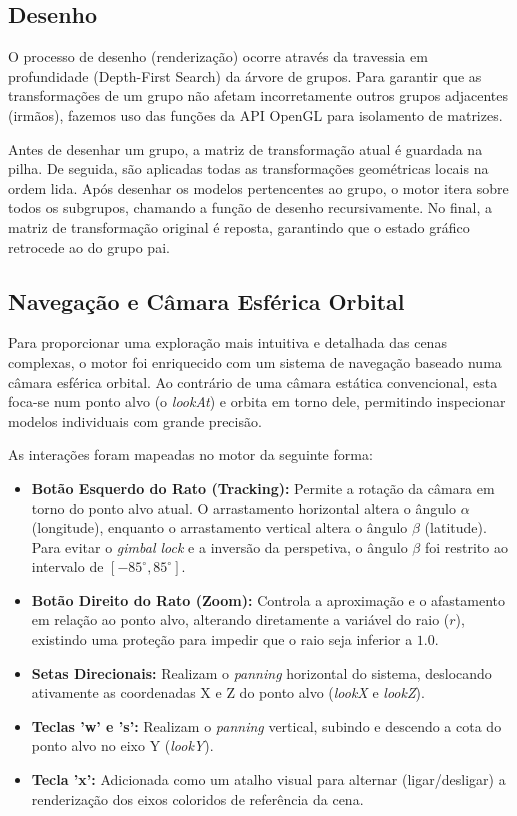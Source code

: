 \documentclass[12pt,a4paper]{article}
\begin{document}
\subsection{Desenho} 
O processo de desenho (renderização) ocorre através da travessia em profundidade (Depth-First Search) da árvore de grupos. Para garantir que as transformações de um grupo não afetam incorretamente outros grupos adjacentes (irmãos), fazemos uso das funções da API OpenGL para isolamento de matrizes.

Antes de desenhar um grupo, a matriz de transformação atual é guardada na pilha. De seguida, são aplicadas todas as transformações geométricas locais na ordem lida. Após desenhar os modelos pertencentes ao grupo, o motor itera sobre todos os subgrupos, chamando a função de desenho recursivamente. No final, a matriz de transformação original é reposta, garantindo que o estado gráfico retrocede ao do grupo pai.
\subsection{Navegação e Câmara Esférica Orbital} 
Para proporcionar uma exploração mais intuitiva e detalhada das cenas complexas, o motor foi enriquecido com um sistema de navegação baseado numa câmara esférica orbital. Ao contrário de uma câmara estática convencional, esta foca-se num ponto alvo (o \textit{lookAt}) e orbita em torno dele, permitindo inspecionar modelos individuais com grande precisão.

As interações foram mapeadas no motor da seguinte forma:
\begin{itemize}
    \item \textbf{Botão Esquerdo do Rato (Tracking):} Permite a rotação da câmara em torno do ponto alvo atual. O arrastamento horizontal altera o ângulo $\alpha$ (longitude), enquanto o arrastamento vertical altera o ângulo $\beta$ (latitude). Para evitar o \textit{gimbal lock} e a inversão da perspetiva, o ângulo $\beta$ foi restrito ao intervalo de $[-85^\circ, 85^\circ]$.
    \item \textbf{Botão Direito do Rato (Zoom):} Controla a aproximação e o afastamento em relação ao ponto alvo, alterando diretamente a variável do raio ($r$), existindo uma proteção para impedir que o raio seja inferior a $1.0$.
    \item \textbf{Setas Direcionais:} Realizam o \textit{panning} horizontal do sistema, deslocando ativamente as coordenadas X e Z do ponto alvo (\textit{lookX} e \textit{lookZ}).
    \item \textbf{Teclas 'w' e 's':} Realizam o \textit{panning} vertical, subindo e descendo a cota do ponto alvo no eixo Y (\textit{lookY}).
    \item \textbf{Tecla 'x':} Adicionada como um atalho visual para alternar (ligar/desligar) a renderização dos eixos coloridos de referência da cena.
\end{itemize}
\end{document}
